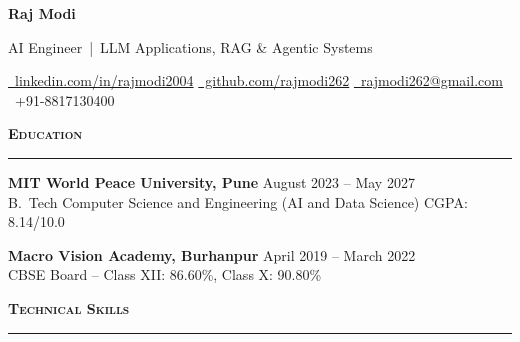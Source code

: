 \documentclass[a4paper,10pt]{article}
\newcommand{\sectionHeader}[2]{%
  \vspace{2.5pt}%
  \noindent%
  {\normalsize\bfseries\color{HeaderDark}#2\enspace\textsc{#1}}%
  \\[-6pt]%
  {\color{SectionLine}\rule{\textwidth}{1pt}}%
  \vspace{1pt}\par%
}
\newcommand{\eduEntry}[4]{%
  \vspace{1pt}%
  \noindent\textbf{\color{HeaderDark}#1} \hfill {\small\color{SubText}#2}\\[-3pt]%
  {\small\color{MidGray}#3} \hfill {\small\color{SubText}#4}%
  \vspace{0pt}\par%
}
\begin{document}

\begin{center}
  {\fontsize{24}{28}\selectfont\bfseries\color{HeaderDark}Raj Modi}

  \vspace{2pt}

  {\small\color{MidGray}AI Engineer \,|\, LLM Applications, RAG \& Agentic Systems}

  \vspace{3pt}

  {\small%
    \href{https://www.linkedin.com/in/rajmodi2004/}{{\color{AccentBlue}\faLinkedin}~\color{LinkBlue}linkedin.com/in/rajmodi2004}%
    \quad{\color{LightGray}|}%
    \quad\href{https://github.com/rajmodi262}{{\color{AccentBlue}\faGithub}~\color{LinkBlue}github.com/rajmodi262}%
    \quad{\color{LightGray}|}%
    \quad\href{mailto:rajmodi262@gmail.com}{{\color{AccentBlue}\faEnvelope}~\color{LinkBlue}rajmodi262@gmail.com}%
    \quad{\color{LightGray}|}%
    \quad{\color{AccentBlue}\faPhone*}~{\color{DarkGray}+91-8817130400}%
  }
\end{center}

\vspace{-2pt}


\sectionHeader{Education}{\faGraduationCap}

\eduEntry{MIT World Peace University, Pune}
  {August 2023 -- May 2027}
  {B.\ Tech Computer Science and Engineering (AI and Data Science)}
  {CGPA: 8.14/10.0}

\eduEntry{Macro Vision Academy, Burhanpur}
  {April 2019 -- March 2022}
  {CBSE Board -- Class XII: 86.60\%, Class X: 90.80\%}
  {}


\sectionHeader{Technical Skills}{\faCogs}
\end{document}
